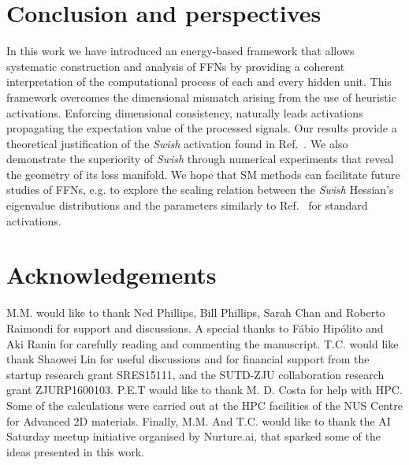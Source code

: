 \documentclass{article}
\begin{document}
\section{Conclusion and perspectives}
%
In this work we have introduced an energy-based framework that allows systematic construction and analysis of FFNs by providing a  coherent interpretation of the computational process of each and every hidden unit. This framework overcomes the dimensional mismatch arising from the use of heuristic activations. Enforcing dimensional consistency, naturally leads activations propagating the expectation value of the processed signals. Our results provide a theoretical justification of the \textit{Swish} activation found in Ref.~\cite{prajit}. We also demonstrate the superiority of {\it Swish} through numerical experiments that reveal the geometry of its loss manifold. We hope that SM methods can facilitate future studies of FFNs, e.g. to explore the scaling relation between the {\it Swish} Hessian's eigenvalue distributions and the parameters similarly to Ref.~\cite{penn1} for standard activations.

\section{Acknowledgements}

M.M. would like to thank Ned Phillips, Bill Phillips, Sarah Chan and Roberto Raimondi for support and discussions. A special thanks to  F\'abio Hip\'olito and Aki Ranin for carefully reading and commenting the manuscript. T.C. would like thank Shaowei Lin for useful discussions and for financial support from the startup research grant
SRES15111, and the SUTD-ZJU collaboration research\\
grant ZJURP1600103. P.E.T would like to thank M. D. Costa for help with HPC. Some of the calculations were carried out at the HPC facilities of the NUS Centre for Advanced 2D materials. Finally, M.M. And T.C. would like to thank the AI Saturday meetup initiative organised by Nurture.ai, that sparked some of the ideas presented in this work.

\appendix
\end{document}
